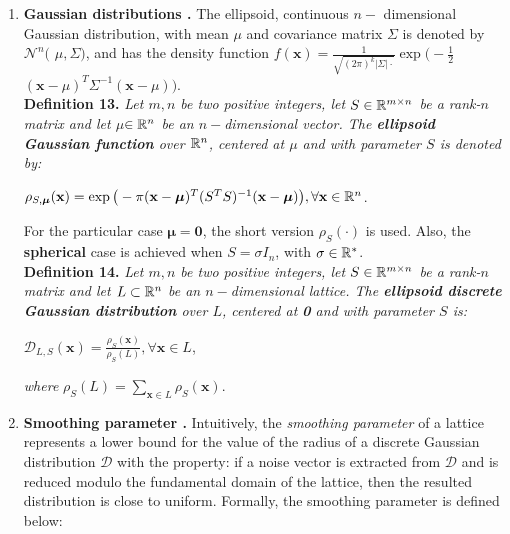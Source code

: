 \begin{enumerate}
	\item \textbf{Gaussian distributions \cite{AGH+12}.} The ellipsoid, continuous $n-$ dimensional Gaussian distribution, with mean {\boldmath$\mu$} and covariance matrix {\boldmath$\Sigma$} is denoted by $\mathcal{N}^n($ {\boldmath$\mu, \Sigma)$}, and has the density function $f(\textbf{x}) = \frac{1}{\sqrt{(2\pi)^k |\Sigma|\cdot}} \exp \big( -\frac{1}{2}$ {\boldmath$(\textbf{x} - \mu)^T \Sigma ^{-1} (\textbf{x} - \mu)$}$\big)$.\\
	
	\textbf{Definition 13.} \textit{ Let $m,n$ be two positive integers, let $S \in \mathbb{R}^{m\times n}$ be a rank-$n$ matrix and let {\boldmath$\mu$}$\in\mathbb{R}^n$ be an $n-$dimensional vector. The \textbf{ellipsoid Gaussian function} over $\mathbb{R}^n$, centered at {\boldmath$\mu$} and with parameter $S$ is denoted by:}
	\begin{center}
		$\rho_{S, \bm{\mu}}(\textbf{x}) = \exp \big(-\pi (\textbf{x} - \bm{\mu})^T(S^TS)^{-1}(\textbf{x} - \bm{\mu}) \big), \forall \textbf{x}\in \mathbb{R}^n$.
	\end{center}

	For the particular case $\bm{\mu} = \textbf{0}$, the short version $\rho_S(\cdot)$ is used. Also, the \textbf{spherical} case is achieved when $S = \sigma I_n$, with $\sigma \in \mathbb{R}^*$.\\
	
	\textbf{Definition 14.} \textit{Let $m,n$ be two positive integers, let $S \in \mathbb{R}^{m\times n}$ be a rank-$n$ matrix and let $L \subset \mathbb{R}^n$ be an $n-$dimensional lattice. The \textbf{ellipsoid discrete Gaussian distribution} over $L$, centered at \textbf{0} and with parameter $S$ is:} 
	\begin{center}
		$\mathcal{D}_{L,S}(\textbf{x}) = \frac{\rho_S(\textbf{x})}{\rho_S(L)}, \forall \textbf{x} \in L$,
	\end{center}
\textit{where} $\rho_S(L) = \displaystyle{\sum_{\textbf{x}\in L} \rho_S(\textbf{x})}$.
	
	\item \textbf{Smoothing parameter \cite{MiR04}.} Intuitively, the \textit{smoothing parameter} of a lattice represents a lower bound for the value of the radius of a discrete Gaussian distribution $\mathcal{D}$ with the property: if a noise vector is extracted from $\mathcal{D}$ and is reduced modulo the fundamental domain of the lattice, then the resulted distribution is close to uniform. Formally, the smoothing parameter is defined below:\\
	

\end{enumerate}
